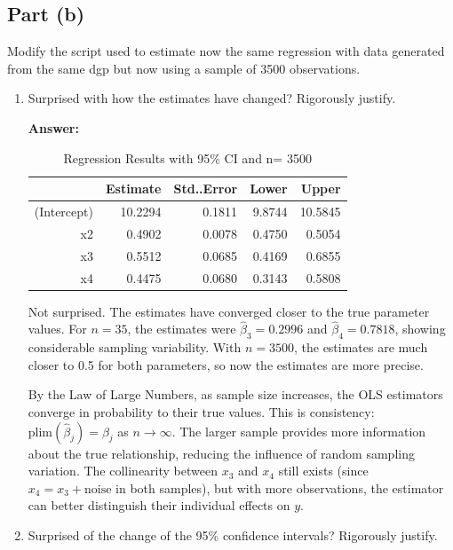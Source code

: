 \documentclass[12pt,a4paper]{article}
\begin{document}
\subsection*{Part (b)}
Modify the script used to estimate now the same regression with data 
generated from the same dgp but now using a sample of 3500 observations.

\begin{enumerate}[label=(\roman*)]
  \item Surprised with how the estimates have changed? Rigorously justify.
  
  \textbf{Answer:} 

  \begin{table}[ht]
\centering
\caption{Regression Results with 95\% CI and n= 3500} 
\label{tab:regression2}
\begin{tabular}{rrrrr}
  \hline
 & Estimate & Std..Error & Lower & Upper \\ 
  \hline
(Intercept) & 10.2294 & 0.1811 & 9.8744 & 10.5845 \\ 
  x2 & 0.4902  & 0.0078  & 0.4750 & 0.5054 \\ 
  x3 &0.5512 &  0.0685 & 0.4169 & 0.6855 \\ 
  x4 & 0.4475 & 0.0680 & 0.3143 & 0.5808 \\ 
   \hline
\end{tabular}
\end{table}
  
  Not surprised. The estimates have converged closer to the true parameter values. For $n=35$, the estimates were $\hat{\beta}_3=0.2996$ 
  and $\hat{\beta}_4=0.7818$, showing considerable sampling variability. 
  With $n=3500$, the estimates are much closer to 0.5 for both parameters, so now the estimates are more precise.
  
  By the Law of Large Numbers, as sample size increases, the OLS estimators 
  converge in probability to their true values. This is consistency: 
  $\text{plim}(\hat{\beta}_j) = \beta_j$ as $n \to \infty$. The larger 
  sample provides more information about the true relationship, reducing 
  the influence of random sampling variation. The collinearity between $x_3$ 
  and $x_4$ still exists (since $x_4 = x_3 + \text{noise}$ in both samples), 
  but with more observations, the estimator can better distinguish their 
  individual effects on $y$.
  
  
  \item Surprised of the change of the 95\% confidence intervals? Rigorously justify.
  

\end{enumerate}
\end{document}
